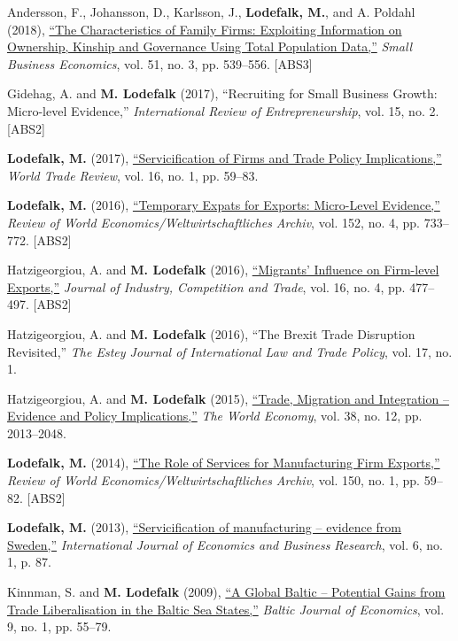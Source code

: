 \documentclass[11pt,a4paper]{article}
\newcommand{\name}[1]{\textbf{#1}}
\newcommand{\publication}[1]{\item #1}
\newcommand{\absrank}[1]{\textcolor{rankgray}{\scriptsize [ABS#1]}}
\begin{document}
\begin{enumerate}[label={[\arabic*]}]
\publication{Andersson, F., Johansson, D., Karlsson, J., \name{Lodefalk, M.}, and A. Poldahl (2018), \href{https://doi.org/10.1007/s11187-017-9947-6}{``The Characteristics of Family Firms: Exploiting Information on Ownership, Kinship and Governance Using Total Population Data,''} \textit{Small Business Economics}, vol. 51, no. 3, pp. 539--556. \absrank{3}}

\publication{Gidehag, A. and \name{M. Lodefalk} (2017), ``Recruiting for Small Business Growth: Micro-level Evidence,'' \textit{International Review of Entrepreneurship}, vol. 15, no. 2. \absrank{2}}

\publication{\name{Lodefalk, M.} (2017), \href{https://doi.org/10.1017/s147474561600029x}{``Servicification of Firms and Trade Policy Implications,''} \textit{World Trade Review}, vol. 16, no. 1, pp. 59--83.}

\publication{\name{Lodefalk, M.} (2016), \href{https://doi.org/10.1007/s10290-016-0254-0}{``Temporary Expats for Exports: Micro-Level Evidence,''} \textit{Review of World Economics/Weltwirtschaftliches Archiv}, vol. 152, no. 4, pp. 733--772. \absrank{2}}

\publication{Hatzigeorgiou, A. and \name{M. Lodefalk} (2016), \href{https://doi.org/10.1007/s10842-015-0215-7}{``Migrants' Influence on Firm-level Exports,''} \textit{Journal of Industry, Competition and Trade}, vol. 16, no. 4, pp. 477--497. \absrank{2}}

\publication{Hatzigeorgiou, A. and \name{M. Lodefalk} (2016), ``The Brexit Trade Disruption Revisited,'' \textit{The Estey Journal of International Law and Trade Policy}, vol. 17, no. 1.}

\publication{Hatzigeorgiou, A. and \name{M. Lodefalk} (2015), \href{https://doi.org/10.1111/twec.12236}{``Trade, Migration and Integration -- Evidence and Policy Implications,''} \textit{The World Economy}, vol. 38, no. 12, pp. 2013--2048.}

\publication{\name{Lodefalk, M.} (2014), \href{https://doi.org/10.1007/s10290-013-0171-4}{``The Role of Services for Manufacturing Firm Exports,''} \textit{Review of World Economics/Weltwirtschaftliches Archiv}, vol. 150, no. 1, pp. 59--82. \absrank{2}}

\publication{\name{Lodefalk, M.} (2013), \href{https://doi.org/10.1504/ijebr.2013.054855}{``Servicification of manufacturing -- evidence from Sweden,''} \textit{International Journal of Economics and Business Research}, vol. 6, no. 1, p. 87.}

\publication{Kinnman, S. and \name{M. Lodefalk} (2009), \href{https://doi.org/10.1080/1406099x.2009.10840453}{``A Global Baltic -- Potential Gains from Trade Liberalisation in the Baltic Sea States,''} \textit{Baltic Journal of Economics}, vol. 9, no. 1, pp. 55--79.}


\end{enumerate}
\end{document}
